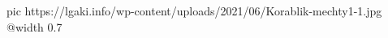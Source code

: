  
 
 
 
 

\ifcmt
  pic https://lgaki.info/wp-content/uploads/2021/06/Korablik-mechty1-1.jpg
  @width 0.7
\fi
